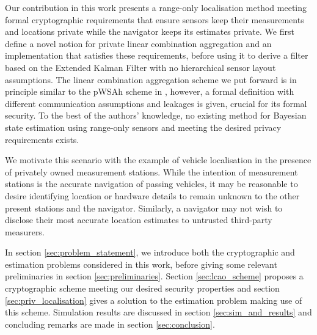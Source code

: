 \documentclass[10pt,letterpaper,oneside,twocolumn,journal]{IEEEtran}
\theoremstyle{definition}
\theoremstyle{definition}
\theoremstyle{remark}
\begin{document}
Our contribution in this work presents a range-only localisation method meeting formal cryptographic requirements that ensure sensors keep their measurements and locations private while the navigator keeps its estimates private. We first define a novel notion for private linear combination aggregation and an implementation that satisfies these requirements, before using it to derive a filter based on the Extended Kalman Filter with no hierarchical sensor layout assumptions. The linear combination aggregation scheme we put forward is in principle similar to the pWSAh scheme in \cite{alexandruPrivateWeightedSum2020}, however, a formal definition with different communication assumptions and leakages is given, crucial for its formal security. To the best of the authors' knowledge, no existing method for Bayesian state estimation using range-only sensors and meeting the desired privacy requirements exists.

We motivate this scenario with the example of vehicle localisation in the presence of privately owned measurement stations. While the intention of measurement stations is the accurate navigation of passing vehicles, it may be reasonable to desire identifying location or hardware details to remain unknown to the other present stations and the navigator. Similarly, a navigator may not wish to disclose their most accurate location estimates to untrusted third-party measurers.

In section \ref{sec:problem_statement}, we introduce both the cryptographic and estimation problems considered in this work, before giving some relevant preliminaries in section \ref{sec:preliminaries}. Section \ref{sec:lcao_scheme} proposes a cryptographic scheme meeting our desired security properties and section \ref{sec:priv_localisation} gives a solution to the estimation problem making use of this scheme. Simulation results are discussed in section \ref{sec:sim_and_results} and concluding remarks are made in section \ref{sec:conclusion}.

% 
% 
\end{document}
